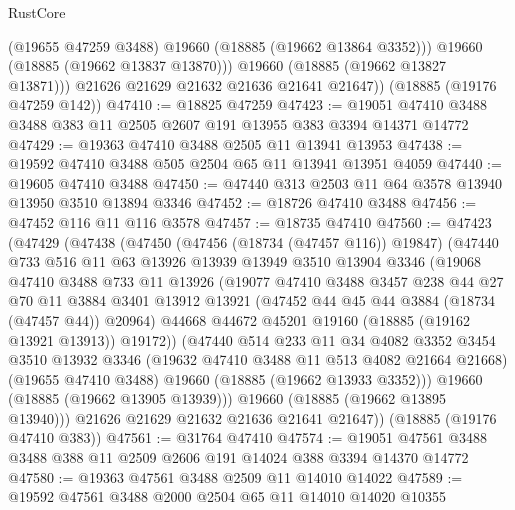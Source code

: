 \begin{lexlean}{RustCore}
\begin{coremodule}
              (@19655 @47259 @3488)
              @19660
              (@18885 (@19662 @13864 @3352)))
            @19660
            (@18885 (@19662 @13837 @13870)))
          @19660
          (@18885 (@19662 @13827 @13871)))
        @21626
        @21629
        @21632
        @21636
        @21641
        @21647))
    (@18885 (@19176 @47259 @142))
@47410 := @18825 @47259
@47423 := @19051 @47410 @3488 @3488 @383 @11 @2505 @2607 @191 @13955 @383 @3394 @14371 @14772
@47429 := @19363 @47410 @3488 @2505 @11 @13941 @13953
@47438 := @19592 @47410 @3488 @505 @2504 @65 @11 @13941 @13951 @4059
@47440 := @19605 @47410 @3488
@47450 := @47440 @313 @2503 @11 @64 @3578 @13940 @13950 @3510 @13894 @3346
@47452 := @18726 @47410 @3488
@47456 := @47452 @116 @11 @116 @3578
@47457 := @18735 @47410
@47560 := @47423
    (@47429
      (@47438
        (@47450
          (@47456 (@18734 (@47457 @116)) @19847)
          (@47440
            @733
            @516
            @11
            @63
            @13926
            @13939
            @13949
            @3510
            @13904
            @3346
            (@19068
              @47410
              @3488
              @733
              @11
              @13926
              (@19077
                @47410
                @3488
                @3457
                @238
                @44
                @27
                @70
                @11
                @3884
                @3401
                @13912
                @13921
                (@47452 @44 @45 @44 @3884 (@18734 (@47457 @44)) @20964)
                @44668
                @44672
                @45201
                @19160
                (@18885 (@19162 @13921 @13913))
                @19172))
            (@47440
              @514
              @233
              @11
              @34
              @4082
              @3352
              @3454
              @3510
              @13932
              @3346
              (@19632 @47410 @3488 @11 @513 @4082 @21664 @21668)
              (@19655 @47410 @3488)
              @19660
              (@18885 (@19662 @13933 @3352)))
            @19660
            (@18885 (@19662 @13905 @13939)))
          @19660
          (@18885 (@19662 @13895 @13940)))
        @21626
        @21629
        @21632
        @21636
        @21641
        @21647))
    (@18885 (@19176 @47410 @383))
@47561 := @31764 @47410
@47574 := @19051 @47561 @3488 @3488 @388 @11 @2509 @2606 @191 @14024 @388 @3394 @14370 @14772
@47580 := @19363 @47561 @3488 @2509 @11 @14010 @14022
@47589 := @19592 @47561 @3488 @2000 @2504 @65 @11 @14010 @14020 @10355

\end{coremodule}
\end{lexlean}
